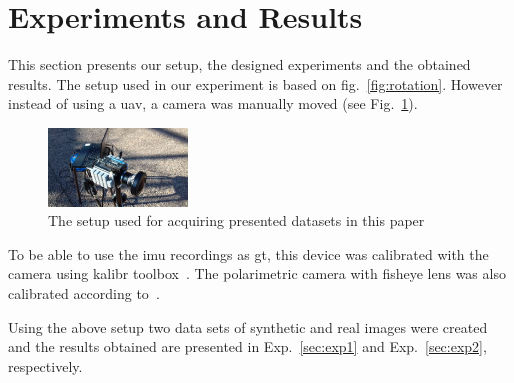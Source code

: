 \graphicspath{{./content/experiments/figures/}}

\section{Experiments and Results}
\label{sec:exp-res}
This section presents our setup, the designed experiments and the obtained
results.
The setup used in our experiment is based on fig.~\ref{fig:rotation}.
However instead of using a \gls{uav}, a camera was manually moved (see
Fig.~\ref{fig:setup}).
\begin{figure}
  \centering
\includegraphics[width=0.33\textwidth]{./content/experiments/figures/setup.jpg}
\caption{The setup used for acquiring presented datasets in this paper}
\label{fig:setup}
\end{figure}
To be able to use the \gls{imu} recordings as \gls{gt}, this device
was calibrated with the camera using kalibr toolbox~\cite{furgale2013unified,
  furgale2012continuous}. The polarimetric camera with fisheye lens was also
calibrated according to~\cite{kannala2006generic}.

Using the above setup two data sets of synthetic and real images were created
and the results obtained are presented in Exp.~\ref{sec:exp1} and
Exp.~\ref{sec:exp2}, respectively.


